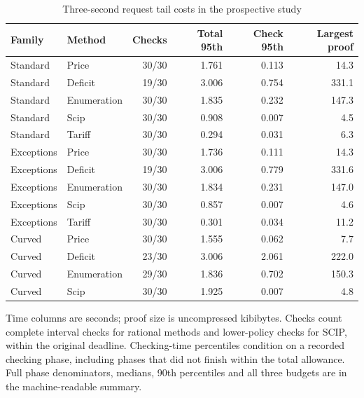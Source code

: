 \begin{table}[p]\centering\caption{Three-second request tail costs in the prospective study}\label{tab:tails60}
\begin{tabular}{llrrrr}\toprule Family & Method & Checks & Total 95th & Check 95th & Largest proof\\\midrule
Standard & Price & 30/30 & 1.761 & 0.113 & 14.3\\
Standard & Deficit & 19/30 & 3.006 & 0.754 & 331.1\\
Standard & Enumeration & 30/30 & 1.835 & 0.232 & 147.3\\
Standard & Scip & 30/30 & 0.908 & 0.007 & 4.5\\
Standard & Tariff & 30/30 & 0.294 & 0.031 & 6.3\\
Exceptions & Price & 30/30 & 1.736 & 0.111 & 14.3\\
Exceptions & Deficit & 19/30 & 3.006 & 0.779 & 331.6\\
Exceptions & Enumeration & 30/30 & 1.834 & 0.231 & 147.0\\
Exceptions & Scip & 30/30 & 0.857 & 0.007 & 4.6\\
Exceptions & Tariff & 30/30 & 0.301 & 0.034 & 11.2\\
Curved & Price & 30/30 & 1.555 & 0.062 & 7.7\\
Curved & Deficit & 23/30 & 3.006 & 2.061 & 222.0\\
Curved & Enumeration & 29/30 & 1.836 & 0.702 & 150.3\\
Curved & Scip & 30/30 & 1.925 & 0.007 & 4.8\\
\bottomrule\end{tabular}\par\smallskip\begin{minipage}{\textwidth}\small Time columns are seconds; proof size is uncompressed kibibytes. Checks count complete interval checks for rational methods and lower-policy checks for SCIP, within the original deadline. Checking-time percentiles condition on a recorded checking phase, including phases that did not finish within the total allowance. Full phase denominators, medians, 90th percentiles and all three budgets are in the machine-readable summary.\end{minipage}\end{table}
